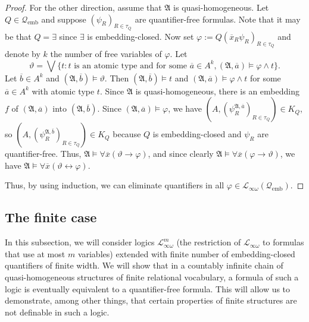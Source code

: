 \documentclass{ndjflart}
\theoremstyle{plain}
\theoremstyle{definition}
\numberwithin{equation}{section}
\DeclareMathOperator{\emb}{emb}
\begin{document}
\begin{proof}
For the other direction, assume that $\mathfrak{A}$ is quasi-homogeneous.
Let $Q \in \mathcal{Q}_{\emb}$ and suppose $(\psi_R)_{R \in \tau_Q}$ are
quantifier-free formulas.
Note that it may be that $Q = \exists$ since $\exists$ is embedding-closed.
Now set $\varphi := Q(\overline{x}_R\psi_R)_{R \in \tau_Q}$ and denote by $k$
the number of free variables of $\varphi$.
Let
\[
	\vartheta = \bigvee\{t \colon 
	t \text{ is an atomic type and for some } 
	\overline{a} \in A^k, (\mathfrak{A}, \overline{a}) \vDash \varphi \wedge t\}.
\]
Let $\overline{b} \in A^k$ and $(\mathfrak{A}, \overline{b}) \vDash \vartheta$.
Then $(\mathfrak{A},\overline{b}) \vDash t$ and
$(\mathfrak{A},\overline{a}) \vDash \varphi \wedge t$ for some
$\overline{a} \in A^k$ with atomic type $t$.
Since $\mathfrak{A}$ is quasi-homogeneous, there is an embedding $f$ of
$(\mathfrak{A},\overline{a})$ into $(\mathfrak{A},\overline{b})$.
Since $(\mathfrak{A},\overline{a}) \vDash \varphi$, we have
$(A,(\psi^{\mathfrak{A},\overline{a}}_R)_{R \in \tau_Q}) \in K_Q$,
so $(A,(\psi^{\mathfrak{A},\overline{b}}_R)_{R \in \tau_Q}) \in K_Q$
because $Q$ is embedding-closed and $\psi_R$ are quantifier-free.
Thus, $\mathfrak{A} \vDash \forall \overline{x}(\vartheta \rightarrow \varphi)$,
and since clearly
$\mathfrak{A} \vDash \forall \overline{x}(\varphi \rightarrow \vartheta)$,
we have
$\mathfrak{A} \vDash \forall \overline{x}(\vartheta \leftrightarrow \varphi)$.

Thus, by using induction, we can eliminate quantifiers in all 
$\varphi \in \mathcal{L}_{\infty\omega}(\mathcal{Q}_{\emb})$.
\end{proof}


\subsection{The finite case}

In this subsection, we will consider logics $\mathcal{L}_{\infty\omega}^m$
(the restriction of $\mathcal{L}_{\infty\omega}$ to formulas that use at most
$m$ variables) extended with finite number of em\-bed\-ding-closed quantifiers
of finite width.
We will show that in a countably infinite chain of quasi-homogeneous structures
of finite relational vocabulary, a formula of such a logic is eventually
equivalent to a quantifier-free formula.
This will allow us to demonstrate, among other things, that certain properties
of finite structures are not definable in such a logic.
\end{document}

